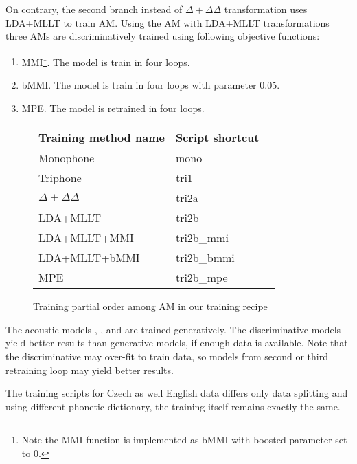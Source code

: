 On contrary, the second branch instead of $\Delta + \Delta\Delta$ transformation uses \ac{LDA}+\ac{MLLT} to train  \ac{AM}.
Using the \ac{AM} with \ac{LDA}+\ac{MLLT} transformations three \acp{AM} are discriminatively trained using following objective functions:
\begin{enumerate}
    \item \acl{MMI}\cite{chow1990maximum}\footnote{Note the \ac{MMI} function is implemented as \acs{bMMI} with boosted parameter set to 0.}. The model is train in four loops.
    \item \acl{bMMI}\cite{povey2008boosted}. The model is train in four loops with parameter 0.05.
    \item \acl{MPE}\cite{povey2003mmi}. The model is retrained in four loops.
\end{enumerate}

\begin{figure}[!htp]
    \begin{center}
    
    \small{\begin{tabular}{lll}
    \hline
    Training method name & Script shortcut \\
    \hline
    Monophone & mono \\
    Triphone  & tri1 \\
    $\Delta + \Delta\Delta$ & tri2a  \\
    \acs{LDA}+\acs{MLLT} & tri2b  \\
    \acs{LDA}+\acs{MLLT}+\acs{MMI} & tri2b\_mmi \\
    \acs{LDA}+\acs{MLLT}+\acs{bMMI} & tri2b\_bmmi \\
    \acs{MPE} & tri2b\_mpe \\
    \hline
    \end{tabular}}
    \end{center}
    \caption{Training partial order among \ac{AM} in our training recipe}
    \label{fig:am-deps} 
\end{figure}

The acoustic models , , 
and  are trained generatively.
The discriminative models yield better results than generative models, if enough data is available. 
Note that the discriminative may over-fit to train data, so models from second or third retraining loop may yield better results. 

The training scripts for Czech as well English data differs only data splitting and using different phonetic dictionary, the training itself remains exactly the same.

